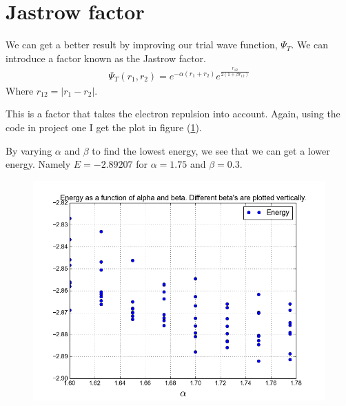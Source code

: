 \documentclass[a4paper, 12pt, titlepage]{article}
\begin{document}
 \section*{Jastrow factor}

 We can get a better result by improving our trial wave function, $\Psi_T$. We can introduce a factor known as the Jastrow factor. 
 \begin{align*}
 	\Psi_T(r_1,r_2) = e^{-\alpha(r_1 + r_2)}e^{\frac{r_{12}}{2(1+\beta r_{12})}}
 \end{align*}
 Where $r_{12} = |r_1 - r_2|$. 

 This is a factor that takes the electron repulsion into account. Again, using the code in project one I get the plot in figure (\ref{Helium3}).
 
 By varying $\alpha$ and $\beta$ to find the lowest energy, we see that we can get a lower energy. Namely $E = -2.89207$ for $\alpha = 1.75$ and $\beta = 0.3$. 

 \begin{figure}[H]
 	\centering
 	\includegraphics[width=\textwidth]{../python_programs/EnergyVariance_helium5.png}
 	\label{Helium3}
 \end{figure}
\end{document}

